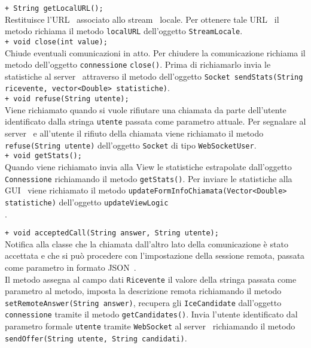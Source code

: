 {{\begin{sloppypar}
{{{\begin{itemize}
{					\texttt{+ String getLocalURL();}\\
					Restituisce l'URL\g~ associato allo stream\g~ locale. Per ottenere tale URL\g~ il metodo richiama il metodo \texttt{localURL} dell'oggetto \texttt{StreamLocale}.\\

					\texttt{+ void close(int value);}\\
					Chiude eventuali comunicazioni in atto. Per chiudere la comunicazione richiama il metodo dell'oggetto \texttt{connessione} \texttt{close()}. Prima di richiamarlo invia le statistiche al server\g~ attraverso il metodo dell'oggetto \texttt{Socket sendStats(String ricevente, vector<Double> statistiche)}.\\

					\texttt{+ void refuse(String utente);}\\
					Viene richiamato quando si vuole rifiutare una chiamata da parte dell'utente identificato dalla stringa \texttt{utente} passata come parametro attuale.
					Per segnalare al server\g~ e all'utente il rifiuto della chiamata viene richiamato il metodo \texttt{refuse(String utente)} dell'oggetto \texttt{Socket} di tipo \texttt{WebSocketUser}.\\

					\texttt{+ void getStats();}\\
					Quando viene richiamato invia alla View le statistiche estrapolate dall'oggetto \texttt{Connessione} richiamando il metodo \texttt{getStats()}. Per inviare le statistiche alla GUI\g~ viene richiamato il metodo \texttt{updateFormInfoChiamata(Vector<Double> statistiche)} dell'oggetto \texttt{updateViewLogic}\\.

					\texttt{+ void acceptedCall(String answer, String utente);}\\
					Notifica alla classe che la chiamata dall'altro lato della comunicazione è stato accettata e che si può procedere con l'impostazione della sessione remota, passata come parametro in formato JSON\g~.\\
					Il metodo assegna al campo dati \texttt{Ricevente} il valore della stringa passata come parametro al metodo, imposta la descrizione remota richiamando il metodo \texttt{setRemoteAnswer(String answer)}, recupera gli \texttt{IceCandidate} dall'oggetto \texttt{connessione} tramite il metodo \texttt{getCandidates()}. Invia l'utente identificato dal parametro formale \texttt{utente} tramite \texttt{WebSocket} al server\g~ richiamando il metodo \texttt{sendOffer(String utente, String candidati)}.\\

}
\end{itemize}}}}
\end{sloppypar}}}
